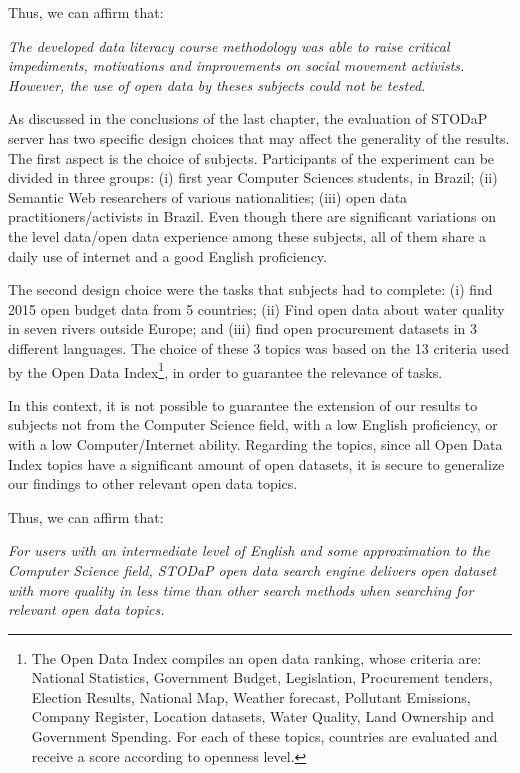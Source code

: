 Thus, we can affirm that:

\noindent \emph{The developed data literacy course methodology was able to raise critical impediments, motivations and improvements on social movement activists. However, the use of open data by theses subjects could not be tested.}

As discussed in the conclusions of the last chapter, the evaluation of STODaP server has two specific design choices that may affect the generality of the results.
The first aspect is the choice of subjects.
Participants of the experiment can be divided in three groups: (i) first year Computer Sciences students, in Brazil; (ii) Semantic Web researchers of various nationalities; (iii) open data practitioners/activists in Brazil.
Even though there are significant variations on the level data/open data experience among these subjects, all of them share a daily use of internet and a good English proficiency.

The second design choice were the tasks that subjects had to complete: (i) find 2015 open budget data from 5 countries; (ii) Find open data about water quality in seven rivers outside Europe; and (iii) find open procurement datasets in 3 different languages.
The choice of these 3 topics was based on the 13 criteria used by the Open Data Index\footnote{The Open Data Index compiles an open data ranking, whose criteria are: National Statistics, Government Budget, Legislation, Procurement tenders, Election Results, National Map, Weather forecast, Pollutant Emissions, Company Register, Location datasets, Water Quality, Land Ownership and Government Spending. For each of these topics, countries are evaluated and receive a score according to openness level.}, in order to guarantee the relevance of tasks.

In this context, it is not possible to guarantee the extension of our results to subjects not from the Computer Science field, with a low English proficiency, or with a low Computer/Internet ability.
Regarding the topics, since all Open Data Index topics have a significant amount of open datasets, it is secure to generalize our findings to other relevant open data topics.

Thus, we can affirm that:

\noindent \emph{For users with an intermediate level of English and some approximation to the Computer Science field, STODaP open data search engine delivers open dataset with more quality in less time than other search methods when searching for relevant open data topics.}


